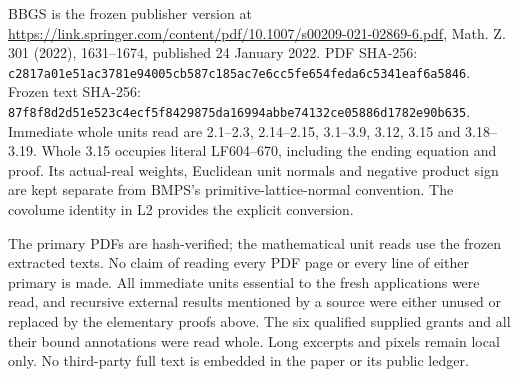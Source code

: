 \documentclass[
  11pt,
]{article}
\begin{document}
BBGS is the frozen publisher version at
\url{https://link.springer.com/content/pdf/10.1007/s00209-021-02869-6.pdf},
Math. Z. 301 (2022), 1631--1674, published 24 January 2022. PDF SHA-256:
\texttt{c2817a01e51ac3781e94005cb587c185ac7e6cc5fe654feda6c5341eaf6a5846}.
Frozen text SHA-256:
\texttt{87f8f8d2d51e523c4ecf5f8429875da16994abbe74132ce05886d1782e90b635}.
Immediate whole units read are 2.1--2.3, 2.14--2.15, 3.1--3.9, 3.12,
3.15 and 3.18--3.19. Whole 3.15 occupies literal LF604--670, including
the ending equation and proof. Its actual-real weights, Euclidean unit
normals and negative product sign are kept separate from BMPS's
primitive-lattice-normal convention. The covolume identity in L2
provides the explicit conversion.

The primary PDFs are hash-verified; the mathematical unit reads use the
frozen extracted texts. No claim of reading every PDF page or every line
of either primary is made. All immediate units essential to the fresh
applications were read, and recursive external results mentioned by a
source were either unused or replaced by the elementary proofs above.
The six qualified supplied grants and all their bound annotations were
read whole. Long excerpts and pixels remain local only. No third-party
full text is embedded in the paper or its public ledger.
\end{document}
